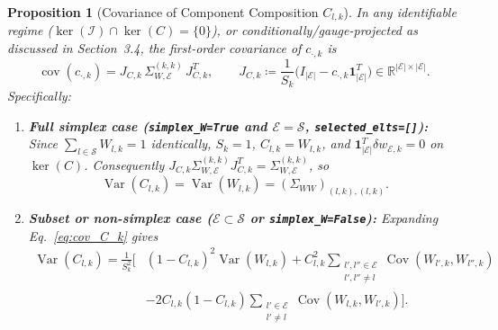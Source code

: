 \documentclass[11pt,a4paper]{article}
\theoremstyle{plain}
\newtheorem{proposition}[theorem]{Proposition}
\theoremstyle{definition}
\theoremstyle{remark}
\newcommand{\R}{\mathbb{R}}
\newcommand{\E}{\mathcal{E}}
\newcommand{\cS}{\mathcal{S}}
\newcommand{\cI}{\mathcal{I}}
\newcommand{\cov}{\operatorname{cov}}
\newcommand{\Var}{\operatorname{Var}}
\newcommand{\Cov}{\operatorname{Cov}}
\newcommand{\one}{\mathbf{1}}
\begin{document}
\begin{proposition}[Covariance of Component Composition $C_{l,k}$]
\label{prop:comp_comp}
In any identifiable regime ($\ker(\cI)\cap\ker(C)=\{0\}$), or conditionally/gauge-projected as discussed in Section~3.4, the first-order covariance of $c_{\cdot, k}$ is
\begin{equation}
\label{eq:cov_C_k}
\cov(c_{\cdot, k}) = J_{C,k} \, \Sigma_{W,\E}^{(k,k)} \, J_{C,k}^T, \qquad J_{C,k} \coloneqq \frac{1}{S_k} \Big( I_{|\E|} - c_{\cdot, k} \one_{|\E|}^T \Big) \in \R^{|\E| \times |\E|}.
\end{equation}
Specifically:
\begin{enumerate}[leftmargin=1.5em]
    \item \textbf{Full simplex case (\texttt{simplex\_W=True} and $\E = \cS$, \texttt{selected\_elts=[]}):} Since $\sum_{l\in\cS} W_{l,k} = 1$ identically, $S_k = 1$, $C_{l,k} = W_{l,k}$, and $\one_{|\E|}^T \delta w_{\E, k} = 0$ on $\ker(C)$. Consequently $J_{C,k} \Sigma_{W,\E}^{(k,k)} J_{C,k}^T = \Sigma_{W,\E}^{(k,k)}$, so
    \begin{equation}
    \label{eq:var_C_simplex}
    \Var(C_{l,k}) = \Var(W_{l,k}) = (\Sigma_{WW})_{(l,k),(l,k)}.
    \end{equation}
    \item \textbf{Subset or non-simplex case ($\E \subset \cS$ or \texttt{simplex\_W=False}):} Expanding Eq.~\eqref{eq:cov_C_k} gives
    \begin{equation}
    \label{eq:var_C_general}
    \begin{aligned}
    \Var(C_{l,k}) = \frac{1}{S_k^2} \Bigg[
    &(1 - C_{l,k})^2 \Var(W_{l,k})
    + C_{l,k}^2 \sum_{\substack{l', l'' \in \E \\ l', l'' \neq l}} \Cov(W_{l', k}, W_{l'', k}) \\
    &- 2 C_{l,k}(1 - C_{l,k}) \sum_{\substack{l' \in \E \\ l' \neq l}} \Cov(W_{l,k}, W_{l', k})
    \Bigg].
    \end{aligned}
    \end{equation}
\end{enumerate}
\end{proposition}
\end{document}
